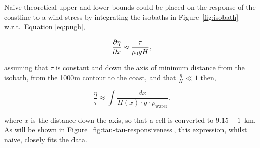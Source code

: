 Naive theoretical upper and lower bounds could be placed on the response of the
coastline to a wind stress by integrating the isobaths in  Figure~\ref{fig:isobath}
w.r.t.~Equation \ref{eq:pugh},

\begin{equation}
\frac{\partial \eta}{\partial x}
\approx \frac{\tau}{\rho_{0} g H},
\notag
\end{equation}

assuming that $\tau$ is constant and down the axis of minimum distance from the isobath,
from the 1000m contour to the coast, and that $\frac{\eta}{H} \ll 1$ then,


\begin{equation}
\frac{\eta}{\tau} \approx \int \frac{d x}{H(x)\cdot g \cdot \rho_{\text {water}}}.
\end{equation}

where $x$ is the distance down the axis, so that a cell is converted to $9.15\pm1$~km.
As will be shown in Figure~\ref{fig:tau-tau-responsiveness}, this expression, whilst
naive, closely fits the data.




\FloatBarrier
